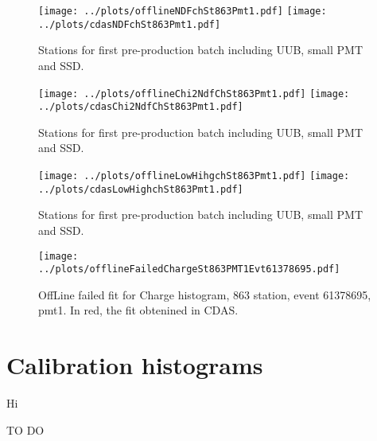 \documentclass[twoside, final, 10pt]{articleMine}
\begin{document}
\begin{figure}[!tbh]
  \centering
  \subfigure
  {
    \texttt{[image: ../plots/offlineNDFchSt863Pmt1.pdf]}
    \texttt{[image: ../plots/cdasNDFchSt863Pmt1.pdf]}
  }
  \caption{Stations for first pre-production batch including UUB, small PMT and SSD.}
  \label{figChNdfserie}
\end{figure}


\begin{figure}[!tbh]
  \centering
  \subfigure
  {
    \texttt{[image: ../plots/offlineChi2NdfChSt863Pmt1.pdf]}
    \texttt{[image: ../plots/cdasChi2NdfChSt863Pmt1.pdf]}
  }
  \caption{Stations for first pre-production batch including UUB, small PMT and SSD.}
  \label{figChChi2Ndfserie}
\end{figure}


\begin{figure}[!tbh]
  \centering
  \subfigure
  {
    \texttt{[image: ../plots/offlineLowHihgchSt863Pmt1.pdf]}
    \texttt{[image: ../plots/cdasLowHighchSt863Pmt1.pdf]}
  }
  \caption{Stations for first pre-production batch including UUB, small PMT and SSD.}
  \label{figChLowHigh}
\end{figure}


\begin{figure}[!tbh]
  \centering
  \subfigure
  {
    \texttt{[image: ../plots/offlineFailedChargeSt863PMT1Evt61378695.pdf]}
  }
  \caption{OffLine failed fit for Charge histogram, 863 station, event 61378695, pmt1. 
  In red, the fit obtenined in CDAS.}
  \label{figChLowHigh}
\end{figure}


























\section*{Calibration histograms}
Hi

TO DO
\end{document}
